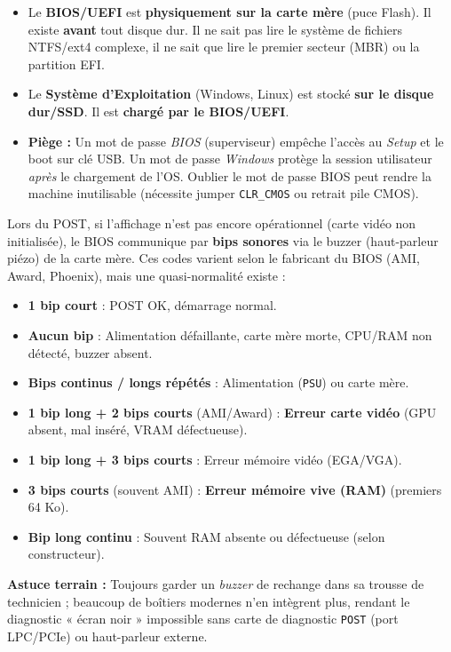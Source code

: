 \documentclass[11pt]{article}
\newcommand{\cle}[1]{{\popxbold\color{popdark}#1}}
\begin{document}
\begin{attention}
\begin{itemize}
    \item Le \textbf{BIOS/UEFI} est \textbf{physiquement sur la carte mère} (puce Flash). Il existe \textbf{avant} tout disque dur. Il ne sait pas lire le système de fichiers NTFS/ext4 complexe, il ne sait que lire le premier secteur (MBR) ou la partition EFI.
    \item Le \textbf{Système d'Exploitation} (Windows, Linux) est stocké \textbf{sur le disque dur/SSD}. Il est \textbf{chargé par le BIOS/UEFI}.
    \item \textbf{Piège :} Un mot de passe \emph{BIOS} (superviseur) empêche l'accès au \emph{Setup} et le boot sur clé USB. Un mot de passe \emph{Windows} protège la session utilisateur \emph{après} le chargement de l'OS. Oublier le mot de passe BIOS peut rendre la machine inutilisable (nécessite jumper \texttt{CLR\_CMOS} ou retrait pile CMOS).
\end{itemize}
\end{attention}

\begin{savaistu}
Lors du \cle{POST}, si l'affichage n'est pas encore opérationnel (carte vidéo non initialisée), le BIOS communique par \textbf{bips sonores} via le buzzer (haut-parleur piézo) de la carte mère. Ces codes varient selon le fabricant du BIOS (AMI, Award, Phoenix), mais une quasi-normalité existe :
\begin{itemize}
    \item \textbf{1 bip court} : POST OK, démarrage normal.
    \item \textbf{Aucun bip} : Alimentation défaillante, carte mère morte, CPU/RAM non détecté, buzzer absent.
    \item \textbf{Bips continus / longs répétés} : Alimentation (\texttt{PSU}) ou carte mère.
    \item \textbf{1 bip long + 2 bips courts} (AMI/Award) : \textbf{Erreur carte vidéo} (GPU absent, mal inséré, VRAM défectueuse).
    \item \textbf{1 bip long + 3 bips courts} : Erreur mémoire vidéo (EGA/VGA).
    \item \textbf{3 bips courts} (souvent AMI) : \textbf{Erreur mémoire vive (RAM)} (premiers 64 Ko).
    \item \textbf{Bip long continu} : Souvent RAM absente ou défectueuse (selon constructeur).
\end{itemize}
\textbf{Astuce terrain :} Toujours garder un \emph{buzzer} de rechange dans sa trousse de technicien ; beaucoup de boîtiers modernes n'en intègrent plus, rendant le diagnostic « écran noir » impossible sans carte de diagnostic \texttt{POST} (port LPC/PCIe) ou haut-parleur externe.
\end{savaistu}
\end{document}
